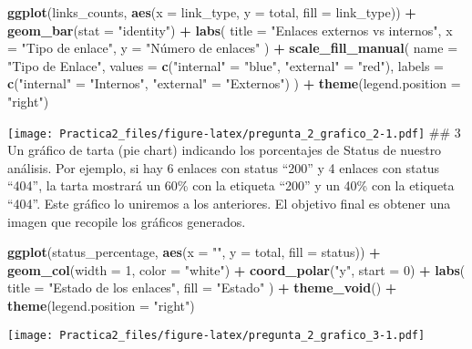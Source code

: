 \documentclass[
]{article}
\newenvironment{Shaded}{\begin{snugshade}}{\end{snugshade}}
\newcommand{\AttributeTok}[1]{\textcolor[rgb]{0.13,0.29,0.53}{#1}}
\newcommand{\DecValTok}[1]{\textcolor[rgb]{0.00,0.00,0.81}{#1}}
\newcommand{\FunctionTok}[1]{\textcolor[rgb]{0.13,0.29,0.53}{\textbf{#1}}}
\newcommand{\NormalTok}[1]{#1}
\newcommand{\OtherTok}[1]{\textcolor[rgb]{0.56,0.35,0.01}{#1}}
\newcommand{\SpecialCharTok}[1]{\textcolor[rgb]{0.81,0.36,0.00}{\textbf{#1}}}
\newcommand{\StringTok}[1]{\textcolor[rgb]{0.31,0.60,0.02}{#1}}
\begin{document}
\begin{Shaded}
\begin{Highlighting}[]
\FunctionTok{ggplot}\NormalTok{(links\_counts, }\FunctionTok{aes}\NormalTok{(}\AttributeTok{x =}\NormalTok{ link\_type, }\AttributeTok{y =}\NormalTok{ total, }\AttributeTok{fill =}\NormalTok{ link\_type)) }\SpecialCharTok{+}
  \FunctionTok{geom\_bar}\NormalTok{(}\AttributeTok{stat =} \StringTok{"identity"}\NormalTok{) }\SpecialCharTok{+}
  \FunctionTok{labs}\NormalTok{(}
    \AttributeTok{title =} \StringTok{"Enlaces externos vs internos"}\NormalTok{,}
    \AttributeTok{x =} \StringTok{"Tipo de enlace"}\NormalTok{,}
    \AttributeTok{y =} \StringTok{"Número de enlaces"}
\NormalTok{  ) }\SpecialCharTok{+}
  \FunctionTok{scale\_fill\_manual}\NormalTok{(}
    \AttributeTok{name   =} \StringTok{"Tipo de Enlace"}\NormalTok{,}
    \AttributeTok{values =} \FunctionTok{c}\NormalTok{(}\StringTok{"internal"} \OtherTok{=} \StringTok{"blue"}\NormalTok{, }\StringTok{"external"} \OtherTok{=} \StringTok{"red"}\NormalTok{),}
    \AttributeTok{labels =} \FunctionTok{c}\NormalTok{(}\StringTok{"internal"} \OtherTok{=} \StringTok{"Internos"}\NormalTok{, }\StringTok{"external"} \OtherTok{=} \StringTok{"Externos"}\NormalTok{)}
\NormalTok{  ) }\SpecialCharTok{+}
  \FunctionTok{theme}\NormalTok{(}\AttributeTok{legend.position =} \StringTok{"right"}\NormalTok{)}
\end{Highlighting}
\end{Shaded}

\texttt{[image: Practica2\_files/figure-latex/pregunta\_2\_grafico\_2-1.pdf]}
\#\# 3 Un gráfico de tarta (pie chart) indicando los porcentajes de
Status de nuestro análisis. Por ejemplo, si hay 6 enlaces con status
``200'' y 4 enlaces con status ``404'', la tarta mostrará un 60\% con la
etiqueta ``200'' y un 40\% con la etiqueta ``404''. Este gráfico lo
uniremos a los anteriores. El objetivo final es obtener una imagen que
recopile los gráficos generados.

\begin{Shaded}
\begin{Highlighting}[]
\FunctionTok{ggplot}\NormalTok{(status\_percentage, }\FunctionTok{aes}\NormalTok{(}\AttributeTok{x =} \StringTok{""}\NormalTok{, }\AttributeTok{y =}\NormalTok{ total, }\AttributeTok{fill =}\NormalTok{ status)) }\SpecialCharTok{+}
  \FunctionTok{geom\_col}\NormalTok{(}\AttributeTok{width =} \DecValTok{1}\NormalTok{, }\AttributeTok{color =} \StringTok{"white"}\NormalTok{) }\SpecialCharTok{+}
  \FunctionTok{coord\_polar}\NormalTok{(}\StringTok{"y"}\NormalTok{, }\AttributeTok{start =} \DecValTok{0}\NormalTok{) }\SpecialCharTok{+}
  \FunctionTok{labs}\NormalTok{(}
    \AttributeTok{title =} \StringTok{"Estado de los enlaces"}\NormalTok{,}
    \AttributeTok{fill  =} \StringTok{"Estado"}
\NormalTok{  ) }\SpecialCharTok{+}
  \FunctionTok{theme\_void}\NormalTok{() }\SpecialCharTok{+}
  \FunctionTok{theme}\NormalTok{(}\AttributeTok{legend.position =} \StringTok{"right"}\NormalTok{)}
\end{Highlighting}
\end{Shaded}

\texttt{[image: Practica2\_files/figure-latex/pregunta\_2\_grafico\_3-1.pdf]}
\end{document}
